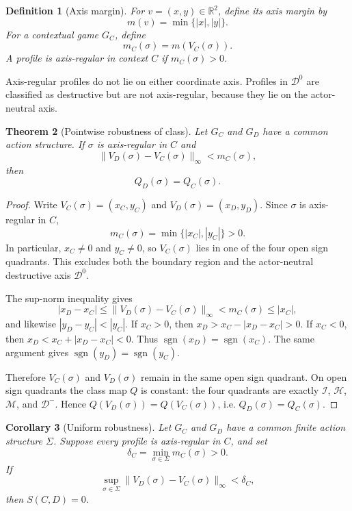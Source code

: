 \documentclass[a4paper,fleqn]{cas-dc}
\newtheorem{definition}{Definition}[section]
\newtheorem{theorem}[definition]{Theorem}
\newtheorem{corollary}[definition]{Corollary}
\theoremstyle{remark}
\newcommand{\R}{\mathbb{R}}
\newcommand{\Prof}{\Sigma}
\newcommand{\sgn}{\operatorname{sgn}}
\begin{document}
\begin{definition}[Axis margin]
For $v=(x,y)\in\R^2$, define its axis margin by
\[
m(v)=\min\{|x|,|y|\}.
\]
For a contextual game $G_C$, define
\[
m_C(\sigma)=m(V_C(\sigma)).
\]
A profile is axis-regular in context $C$ if $m_C(\sigma)>0$.
\end{definition}

Axis-regular profiles do not lie on either coordinate axis. Profiles in $\mathcal D^0$ are classified as destructive but are not axis-regular, because they lie on the actor-neutral axis.


\begin{theorem}[Pointwise robustness of class]
\label{thm:pointwise-robustness}
Let $G_C$ and $G_D$ have a common action structure. If $\sigma$ is axis-regular in $C$ and
\[
\|V_D(\sigma)-V_C(\sigma)\|_\infty<m_C(\sigma),
\]
then
\[
Q_D(\sigma)=Q_C(\sigma).
\]
\end{theorem}

\begin{proof}
Write $V_C(\sigma)=(x_C,y_C)$ and $V_D(\sigma)=(x_D,y_D)$. Since $\sigma$ is axis-regular in $C$,
\[
m_C(\sigma)=\min\{|x_C|,|y_C|\}>0.
\]
In particular, $x_C\ne 0$ and $y_C\ne 0$, so $V_C(\sigma)$ lies in one of the four open sign quadrants. This excludes both the boundary region and the actor-neutral destructive axis $\mathcal D^0$.

The sup-norm inequality gives
\[
|x_D-x_C|\le \|V_D(\sigma)-V_C(\sigma)\|_\infty<m_C(\sigma)\le |x_C|,
\]
and likewise $|y_D-y_C|<|y_C|$. If $x_C>0$, then $x_D>x_C-|x_D-x_C|>0$. If $x_C<0$, then $x_D<x_C+|x_D-x_C|<0$. Thus $\sgn(x_D)=\sgn(x_C)$. The same argument gives $\sgn(y_D)=\sgn(y_C)$.

Therefore $V_C(\sigma)$ and $V_D(\sigma)$ remain in the same open sign quadrant. On open sign quadrants the class map $Q$ is constant: the four quadrants are exactly $\mathcal I$, $\mathcal H$, $\mathcal M$, and $\mathcal D^-$. Hence $Q(V_D(\sigma))=Q(V_C(\sigma))$, i.e. $Q_D(\sigma)=Q_C(\sigma)$.
\end{proof}

\begin{corollary}[Uniform robustness]
\label{cor:uniform-robustness}
Let $G_C$ and $G_D$ have a common finite action structure $\Prof$. Suppose every profile is axis-regular in $C$, and set
\[
\delta_C=\min_{\sigma\in\Prof}m_C(\sigma)>0.
\]
If
\[
\sup_{\sigma\in\Prof}\|V_D(\sigma)-V_C(\sigma)\|_\infty<\delta_C,
\]
then $S(C,D)=0$.
\end{corollary}
\end{document}
